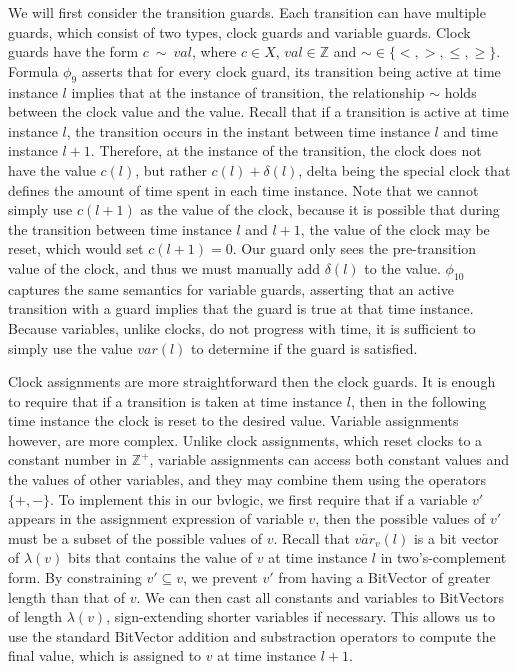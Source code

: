 \documentclass[a4paper,12pt]{article}
\begin{document}
We will first consider the transition guards. Each transition can have multiple
guards, which consist of two types, clock guards and variable guards. Clock
guards have the form \(c\ \sim\ val\), where \(c \in X\), \(val \in
\mathbb{Z}\) and \(\sim \in \{<,>,\leq,\geq\}\). Formula \(\phi_9\) asserts that
for every clock guard, its transition being active at time instance \(l\)
implies that at the instance of transition, the relationship \(\sim\) holds
between the clock value and the value. Recall that if a transition is active at
time instance \(l\), the transition occurs in the instant between time instance
\(l\) and time instance \(l+1\). Therefore, at the instance of the transition,
the clock does not have the value \(c(l)\), but rather \(c(l) + \delta(l)\),
delta being the special clock that defines the amount of time spent in each time
instance. Note that we cannot simply use \(c(l+1)\) as the value of the clock,
because it is possible that during the transition between time instance \(l\)
and \(l+1\), the value of the clock may be reset, which would set \(c(l+1)=0\).
Our guard only sees the pre-transition value of the clock, and thus we must
manually add \(\delta(l)\) to the value.
\(\phi_{10}\) captures the same semantics for variable guards, asserting that an
active transition with a guard implies that the guard is true at that time
instance. Because variables, unlike clocks, do not progress with time, it is
sufficient to simply use the value \(var(l)\) to determine if the guard is satisfied.

Clock assignments are more straightforward then the clock guards. It is enough
to require that if a transition is taken at time instance \(l\), then in the
following time instance the clock is reset to the desired value. Variable
assignments however, are more complex. Unlike clock assignments, which reset
clocks to a constant number in \(\mathbb{Z}^+\), variable assignments can access
both constant values and the values of other variables, and they may combine
them using the operators \(\{+,-\}\). To implement this in our bvlogic, we first
require that if a variable \(v'\) appears in the assignment expression of
variable \(v\), then the possible values of \(v'\) must be a subset of the
possible values of \(v\). Recall that \(\overleftarrow{var_v}(l)\) is a bit
vector of \(\lambda(v)\) bits that contains the value of \(v\) at time instance
\(l\) in two's-complement form. By constraining \(v' \subseteq v\), we prevent
\(v'\) from having a BitVector of greater length than that of \(v\). We can then
cast all constants and variables to BitVectors of length \(\lambda(v)\),
sign-extending shorter variables if necessary. This allows us to use the
standard BitVector addition and substraction operators to compute the final
value, which is assigned to \(v\) at time instance \(l+1\).
\end{document}
